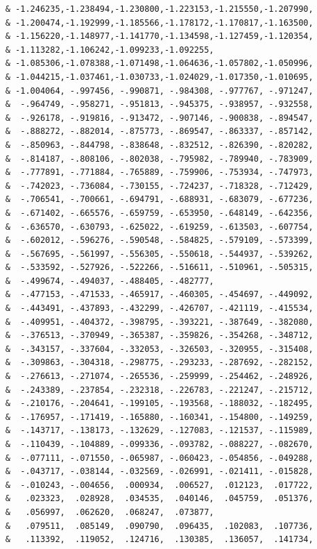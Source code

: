 \begin{lstlisting}
     & -1.246235,-1.238494,-1.230800,-1.223153,-1.215550,-1.207990,
     & -1.200474,-1.192999,-1.185566,-1.178172,-1.170817,-1.163500,
     & -1.156220,-1.148977,-1.141770,-1.134598,-1.127459,-1.120354,
     & -1.113282,-1.106242,-1.099233,-1.092255,
     & -1.085306,-1.078388,-1.071498,-1.064636,-1.057802,-1.050996,
     & -1.044215,-1.037461,-1.030733,-1.024029,-1.017350,-1.010695,
     & -1.004064, -.997456, -.990871, -.984308, -.977767, -.971247,
     &  -.964749, -.958271, -.951813, -.945375, -.938957, -.932558,
     &  -.926178, -.919816, -.913472, -.907146, -.900838, -.894547,
     &  -.888272, -.882014, -.875773, -.869547, -.863337, -.857142,
     &  -.850963, -.844798, -.838648, -.832512, -.826390, -.820282,
     &  -.814187, -.808106, -.802038, -.795982, -.789940, -.783909,
     &  -.777891, -.771884, -.765889, -.759906, -.753934, -.747973,
     &  -.742023, -.736084, -.730155, -.724237, -.718328, -.712429,
     &  -.706541, -.700661, -.694791, -.688931, -.683079, -.677236,
     &  -.671402, -.665576, -.659759, -.653950, -.648149, -.642356,
     &  -.636570, -.630793, -.625022, -.619259, -.613503, -.607754,
     &  -.602012, -.596276, -.590548, -.584825, -.579109, -.573399,
     &  -.567695, -.561997, -.556305, -.550618, -.544937, -.539262,
     &  -.533592, -.527926, -.522266, -.516611, -.510961, -.505315,
     &  -.499674, -.494037, -.488405, -.482777,
     &  -.477153, -.471533, -.465917, -.460305, -.454697, -.449092,
     &  -.443491, -.437893, -.432299, -.426707, -.421119, -.415534,
     &  -.409951, -.404372, -.398795, -.393221, -.387649, -.382080,
     &  -.376513, -.370949, -.365387, -.359826, -.354268, -.348712,
     &  -.343157, -.337604, -.332053, -.326503, -.320955, -.315408,
     &  -.309863, -.304318, -.298775, -.293233, -.287692, -.282152,
     &  -.276613, -.271074, -.265536, -.259999, -.254462, -.248926,
     &  -.243389, -.237854, -.232318, -.226783, -.221247, -.215712,
     &  -.210176, -.204641, -.199105, -.193568, -.188032, -.182495,
     &  -.176957, -.171419, -.165880, -.160341, -.154800, -.149259,
     &  -.143717, -.138173, -.132629, -.127083, -.121537, -.115989,
     &  -.110439, -.104889, -.099336, -.093782, -.088227, -.082670,
     &  -.077111, -.071550, -.065987, -.060423, -.054856, -.049288,
     &  -.043717, -.038144, -.032569, -.026991, -.021411, -.015828,
     &  -.010243, -.004656,  .000934,  .006527,  .012123,  .017722,
     &   .023323,  .028928,  .034535,  .040146,  .045759,  .051376,
     &   .056997,  .062620,  .068247,  .073877,
     &   .079511,  .085149,  .090790,  .096435,  .102083,  .107736,
     &   .113392,  .119052,  .124716,  .130385,  .136057,  .141734,

\end{lstlisting}
